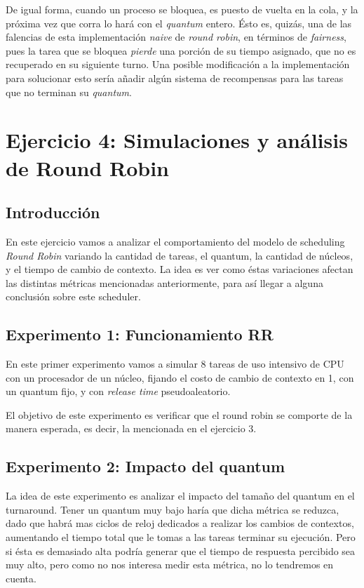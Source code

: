 \documentclass[a4paper]{article}
\begin{document}
De igual forma, cuando un proceso se bloquea, es puesto de vuelta en la
cola, y la próxima vez que corra lo hará con el \textit{quantum} entero.
Ésto es, quizás, una de las falencias de esta implementación \textit{naive}
de \textit{round robin}, en términos de \textit{fairness}, pues la tarea que
se bloquea \textit{pierde} una porción de su tiempo asignado, que no es
recuperado en su siguiente turno. Una posible modificación a la
implementación para solucionar esto sería añadir algún sistema de
recompensas para las tareas que no terminan su \textit{quantum}.

\section{Ejercicio 4: Simulaciones y análisis de Round Robin}

\subsection{Introducción}
En este ejercicio vamos a analizar el comportamiento del modelo de
scheduling \textit{Round Robin} variando la cantidad de tareas, el quantum,
la cantidad de núcleos, y el tiempo de cambio de contexto.
La idea es ver como éstas variaciones afectan las distintas métricas
mencionadas anteriormente, para así llegar a alguna conclusión sobre este
scheduler.

\subsection{Experimento 1: Funcionamiento RR}
En este primer experimento vamos a simular 8 tareas de uso intensivo de CPU
con un procesador de un núcleo, fijando el costo de cambio de contexto en 1,
con un quantum fijo, y con \textit{release time} pseudoaleatorio.

El objetivo de este experimento es verificar que el round robin se comporte
de la manera esperada, es decir, la mencionada en el ejercicio 3.


\subsection{Experimento 2: Impacto del quantum}
La idea de este experimento es analizar el impacto del tamaño del quantum en el turnaround. Tener un quantum muy bajo haría que dicha métrica se reduzca,
dado que habrá mas ciclos de reloj dedicados a realizar los cambios de
contextos, aumentando el tiempo total que le tomas a las tareas terminar su
ejecución. Pero si ésta es demasiado alta podría generar que el tiempo de
respuesta percibido sea muy alto, pero como no nos interesa medir esta
métrica, no lo tendremos en cuenta.
\end{document}
